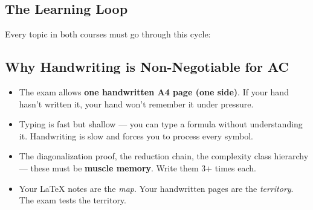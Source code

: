 \documentclass[11pt,a4paper]{article}
\begin{document}
\subsection{The Learning Loop}

Every topic in both courses must go through this cycle:

\begin{center}
\end{center}

\subsection{Why Handwriting is Non-Negotiable for AC}

\begin{itemize}[nosep]
\item The exam allows \textbf{one handwritten A4 page (one side)}. If your hand hasn't written it, your hand won't remember it under pressure.
\item Typing is fast but shallow --- you can type a formula without understanding it. Handwriting is slow and forces you to process every symbol.
\item The diagonalization proof, the reduction chain, the complexity class hierarchy --- these must be \textbf{muscle memory}. Write them 3+ times each.
\item Your LaTeX notes are the \textit{map}. Your handwritten pages are the \textit{territory}. The exam tests the territory.
\end{itemize}
\end{document}
